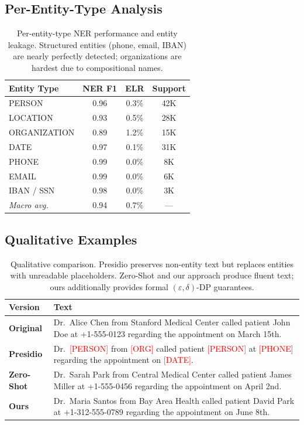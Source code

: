 \documentclass[11pt, a4paper]{article}
\begin{document}
\subsection{Per-Entity-Type Analysis}

\begin{table}[H]
\centering
\small
\begin{tabular}{l ccc}
\toprule
\textbf{Entity Type} & \textbf{NER F1} & \textbf{ELR} & \textbf{Support} \\
\midrule
PERSON       & 0.96 & 0.3\% & 42K \\
LOCATION     & 0.93 & 0.5\% & 28K \\
ORGANIZATION & 0.89 & 1.2\% & 15K \\
DATE         & 0.97 & 0.1\% & 31K \\
PHONE        & 0.99 & 0.0\% & 8K \\
EMAIL        & 0.99 & 0.0\% & 6K \\
IBAN / SSN   & 0.98 & 0.0\% & 3K \\
\midrule
\textit{Macro avg.} & 0.94 & 0.7\% & --- \\
\bottomrule
\end{tabular}
\caption{Per-entity-type NER performance and entity leakage.
Structured entities (phone, email, IBAN) are nearly perfectly
detected; organizations are hardest due to compositional names.}
\label{tab:per_entity}
\end{table}

\subsection{Qualitative Examples}

\begin{table}[H]
\centering
\small
\begin{tabular}{p{} p{}}
\toprule
\textbf{Version} & \textbf{Text} \\
\midrule
\textbf{Original} & Dr.\ Alice Chen from Stanford Medical Center called
patient John Doe at +1-555-0123 regarding the appointment on March
15th. \\
\midrule
\textbf{Presidio} & Dr.\ \textcolor{red}{[PERSON]} from
\textcolor{red}{[ORG]} called patient \textcolor{red}{[PERSON]} at
\textcolor{red}{[PHONE]} regarding the appointment on
\textcolor{red}{[DATE]}. \\
\midrule
\textbf{Zero-Shot} & Dr.\ Sarah Park from Central Medical Center called
patient James Miller at +1-555-0456 regarding the appointment on April
2nd. \\
\midrule
\textbf{Ours} & Dr.\ Maria Santos from Bay Area Health called patient
David Park at +1-312-555-0789 regarding the appointment on June 8th. \\
\bottomrule
\end{tabular}
\caption{Qualitative comparison.  Presidio preserves non-entity text
but replaces entities with unreadable placeholders.  Zero-Shot and our
approach produce fluent text; ours additionally provides formal
$(\varepsilon, \delta)$-DP guarantees.}
\label{tab:qualitative}
\end{table}
\end{document}
